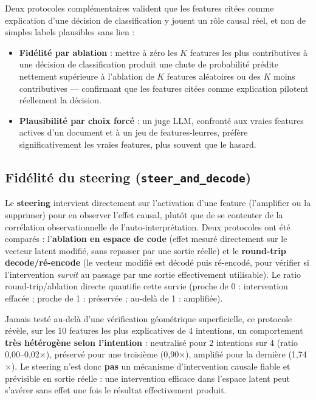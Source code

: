 \documentclass[11pt]{article}
\begin{document}
Deux protocoles complémentaires valident que les features citées comme
explication d'une décision de classification y jouent un rôle causal réel,
et non de simples labels plausibles sans lien :

\begin{itemize}
  \item \textbf{Fidélité par ablation} : mettre à zéro les $K$ features les
    plus contributives à une décision de classification produit une chute de
    probabilité prédite nettement supérieure à l'ablation de $K$ features
    aléatoires ou des $K$ moins contributives --- confirmant que les features
    citées comme explication pilotent réellement la décision.
  \item \textbf{Plausibilité par choix forcé} : un juge LLM, confronté aux
    vraies features actives d'un document et à un jeu de features-leurres,
    préfère significativement les vraies features, plus souvent que le
    hasard.
\end{itemize}

\subsection{Fidélité du steering (\texttt{steer\_and\_decode})}

Le \textbf{steering} intervient directement sur l'activation d'une feature
(l'amplifier ou la supprimer) pour en observer l'effet causal, plutôt que de
se contenter de la corrélation observationnelle de l'auto-interprétation.
Deux protocoles ont été comparés : l'\textbf{ablation en espace de code}
(effet mesuré directement sur le vecteur latent modifié, sans repasser par
une sortie réelle) et le \textbf{round-trip decode/ré-encode} (le vecteur
modifié est décodé puis ré-encodé, pour vérifier si l'intervention
\emph{survit} au passage par une sortie effectivement utilisable). Le ratio
round-trip/ablation directe quantifie cette survie (proche de 0 : intervention
effacée ; proche de 1 : préservée ; au-delà de 1 : amplifiée).

Jamais testé au-delà d'une vérification géométrique superficielle, ce
protocole révèle, sur les 10 features les plus explicatives de 4 intentions,
un comportement \textbf{très hétérogène selon l'intention} : neutralisé pour
2 intentions sur 4 (ratio 0,00--0,02$\times$), préservé pour une troisième
(0,90$\times$), amplifié pour la dernière (1,74$\times$). Le steering n'est
donc \textbf{pas} un mécanisme d'intervention causale fiable et prévisible en
sortie réelle : une intervention efficace dans l'espace latent peut s'avérer
sans effet une fois le résultat effectivement produit.
\end{document}
